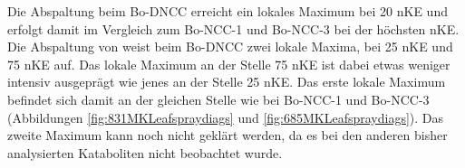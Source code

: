 Die  Abspaltung beim Bo-DNCC erreicht ein lokales Maximum bei 20 \gls{nKE} und erfolgt damit im Vergleich zum Bo-NCC-1 und Bo-NCC-3 bei der höchsten \gls{nKE}. Die Abspaltung von  weist beim Bo-DNCC zwei lokale Maxima, bei 25 \gls{nKE} und 75 \gls{nKE} auf. Das lokale Maximum an der Stelle 75 \gls{nKE} ist dabei etwas weniger intensiv ausgeprägt wie jenes an der Stelle 25 \gls{nKE}. Das erste lokale Maximum befindet sich damit an der gleichen Stelle wie bei Bo-NCC-1 und Bo-NCC-3 (Abbildungen \ref{fig:831MKLeafspraydiags} und \ref{fig:685MKLeafspraydiags}). Das zweite Maximum kann noch nicht geklärt werden, da es bei den anderen bisher analysierten Kataboliten nicht beobachtet wurde.
